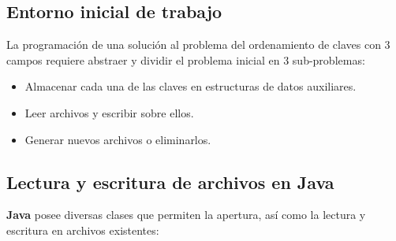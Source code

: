 \documentclass[letterpaper,12pt]{extarticle}
\begin{document}
\subsection{Entorno inicial de trabajo}
    
\noindent La programación de una solución al problema del ordenamiento de claves con 3 campos requiere abstraer y dividir el problema inicial en 3 sub-problemas:

\begin{itemize}
\item Almacenar cada una de las claves en estructuras de datos auxiliares.

\item Leer archivos y escribir sobre ellos.

\item Generar nuevos archivos o eliminarlos. 

\end{itemize}
    
\subsection{Lectura y escritura de archivos en Java}

\noindent \textbf{Java} posee diversas clases que permiten la apertura, así como la lectura y escritura en archivos existentes:
\end{document}
